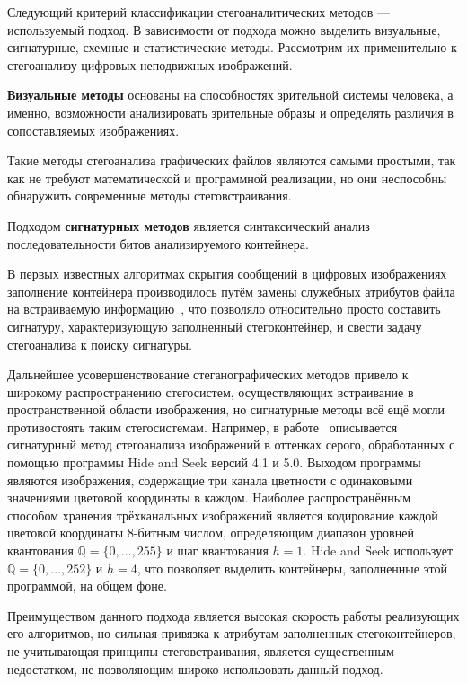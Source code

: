 Следующий критерий классификации стегоаналитических методов — используемый подход. В зависимости от подхода можно выделить визуальные, сигнатурные, схемные и статистические методы. Рассмотрим их применительно к стегоанализу цифровых неподвижных изображений.

\textbf{Визуальные методы} основаны на способностях зрительной системы человека, а именно, возможности анализировать зрительные образы и определять различия в сопоставляемых изображениях.

Такие методы стегоанализа графических файлов являются самыми простыми, так как не требуют математической и программной реализации,  но они неспособны обнаружить современные методы стеговстраивания.

Подходом \textbf{сигнатурных методов} является синтаксический анализ последовательности битов анализируемого контейнера.

В первых известных алгоритмах скрытия сообщений в цифровых изображениях заполнение контейнера производилось путём замены служебных атрибутов файла на встраиваемую информацию~\cite{FridrichBook}, что позволяло относительно просто составить сигнатуру, характеризующую заполненный стегоконтейнер, и свести задачу стегоанализа к поиску сигнатуры.

Дальнейшее усовершенствование стеганографических методов привело к широкому распространению стегосистем, осуществляющих встраивание в пространственной области изображения, но сигнатурные методы всё ещё могли противостоять таким стегосистемам. Например, в работе~\cite{HideAndSeek} описывается сигнатурный метод стегоанализа изображений в оттенках серого, обработанных с помощью программы Hide and Seek версий 4.1 и 5.0. Выходом программы являются изображения, содержащие три канала цветности с одинаковыми значениями цветовой координаты в каждом. Наиболее распространённым способом хранения трёхканальных изображений является кодирование каждой цветовой координаты 8-битным числом, определяющим диапазон уровней квантования $ \mathbb{Q} = \{0, \dotsc,255\} $ и шаг квантования $ h = 1 $. Hide and Seek использует $ \mathbb{Q} = \{0, \dotsc,252\} $ и $ h = 4 $, что позволяет выделить контейнеры, заполненные этой программой, на общем фоне.

Преимуществом данного подхода является высокая скорость работы реализующих его алгоритмов, но сильная привязка к атрибутам заполненных стегоконтейнеров, не учитывающая принципы стеговстраивания, является существенным недостатком, не позволяющим широко использовать данный подход.

